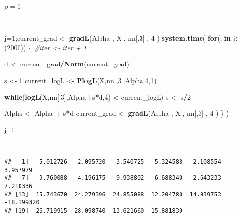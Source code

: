 \documentclass[]{article}
\newenvironment{Shaded}{\begin{snugshade}}{\end{snugshade}}
\newcommand{\KeywordTok}[1]{\textcolor[rgb]{0.13,0.29,0.53}{\textbf{#1}}}
\newcommand{\DecValTok}[1]{\textcolor[rgb]{0.00,0.00,0.81}{#1}}
\newcommand{\StringTok}[1]{\textcolor[rgb]{0.31,0.60,0.02}{#1}}
\newcommand{\CommentTok}[1]{\textcolor[rgb]{0.56,0.35,0.01}{\textit{#1}}}
\newcommand{\ControlFlowTok}[1]{\textcolor[rgb]{0.13,0.29,0.53}{\textbf{#1}}}
\newcommand{\OperatorTok}[1]{\textcolor[rgb]{0.81,0.36,0.00}{\textbf{#1}}}
\newcommand{\NormalTok}[1]{#1}
\begin{document}
~

\hfil {\Large $\rho = 1$}

~

\begin{Shaded}
\begin{Highlighting}[]
\NormalTok{j=}\DecValTok{1}\NormalTok{;current_grad <-}\StringTok{ }\KeywordTok{gradL}\NormalTok{(Alpha , X , nn[,}\DecValTok{3}\NormalTok{] , }\DecValTok{4}\NormalTok{ ) }
\KeywordTok{system.time}\NormalTok{(}
 \ControlFlowTok{for}\NormalTok{(i }\ControlFlowTok{in}\NormalTok{ j}\OperatorTok{:}\NormalTok{(}\DecValTok{2000}\NormalTok{)) \{}
    \CommentTok{#iter <- iter + 1}
    
\NormalTok{    d <-}\StringTok{ }\NormalTok{current_grad}\OperatorTok{/}\KeywordTok{Norm}\NormalTok{(current_grad)    }
    
\NormalTok{    s <-}\StringTok{ }\DecValTok{1} 
\NormalTok{    current_logL <-}\StringTok{ }\KeywordTok{PlogL}\NormalTok{(X,nn[,}\DecValTok{3}\NormalTok{],Alpha,}\DecValTok{4}\NormalTok{,}\DecValTok{1}\NormalTok{)}
    
    \ControlFlowTok{while}\NormalTok{(}\KeywordTok{logL}\NormalTok{(X,nn[,}\DecValTok{3}\NormalTok{],Alpha}\OperatorTok{+}\NormalTok{s}\OperatorTok{*}\NormalTok{d,}\DecValTok{4}\NormalTok{)  }\OperatorTok{<}\StringTok{ }\NormalTok{current_logL)}
\NormalTok{         s <-}\StringTok{ }\NormalTok{s}\OperatorTok{/}\DecValTok{2} 

\NormalTok{    Alpha <-}\StringTok{ }\NormalTok{Alpha }\OperatorTok{+}\StringTok{ }\NormalTok{s}\OperatorTok{*}\NormalTok{d}
\NormalTok{    current_grad <-}\StringTok{  }\KeywordTok{gradL}\NormalTok{(Alpha , X , nn[,}\DecValTok{3}\NormalTok{] , }\DecValTok{4}\NormalTok{ ) \} )}


\NormalTok{j=i}
\end{Highlighting}
\end{Shaded}

~

\begin{verbatim}
##  [1]  -5.012726   2.095720   3.540725  -5.324588  -2.108554   3.957979
##  [7]   9.760088  -4.196175   9.938802   6.688340   2.643233   7.210336
## [13]  15.743670  24.279396  24.855088 -12.204780 -14.039753 -18.199320
## [19] -26.719915 -28.098740  13.621660  15.881839
\end{verbatim}
\end{document}
